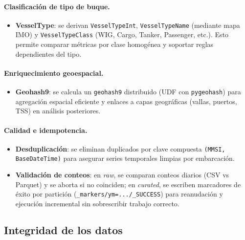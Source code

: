 \documentclass[10pt]{article}
\begin{document}
\paragraph{Clasificación de tipo de buque.}
\begin{itemize}
  \item \textbf{VesselType}: se derivan \texttt{VesselTypeInt}, \texttt{VesselTypeName} (mediante mapa IMO) y \texttt{VesselTypeClass} (WIG, Cargo, Tanker, Passenger, etc.). Esto permite comparar métricas por clase homogénea y soportar reglas dependientes del tipo.
\end{itemize}

\paragraph{Enriquecimiento geoespacial.}
\begin{itemize}
  \item \textbf{Geohash9}: se calcula un \texttt{geohash9} distribuido (UDF con \texttt{pygeohash}) para agregación espacial eficiente y enlaces a capas geográficas (vallas, puertos, TSS) en análisis posteriores.
\end{itemize}

\paragraph{Calidad e idempotencia.}
\begin{itemize}
  \item \textbf{Desduplicación}: se eliminan duplicados por clave compuesta \texttt{(MMSI, BaseDateTime)} para asegurar series temporales limpias por embarcación.
  \item \textbf{Validación de conteos}: en \textit{raw}, se comparan conteos diarios (CSV vs Parquet) y se aborta si no coinciden; en \textit{curated}, se escriben marcadores de éxito por partición (\texttt{\_markers/ym=.../\_SUCCESS}) para reanudación y ejecución incremental sin sobrescribir trabajo correcto.
\end{itemize}
\subsection{Integridad de los datos} %
\end{document}
